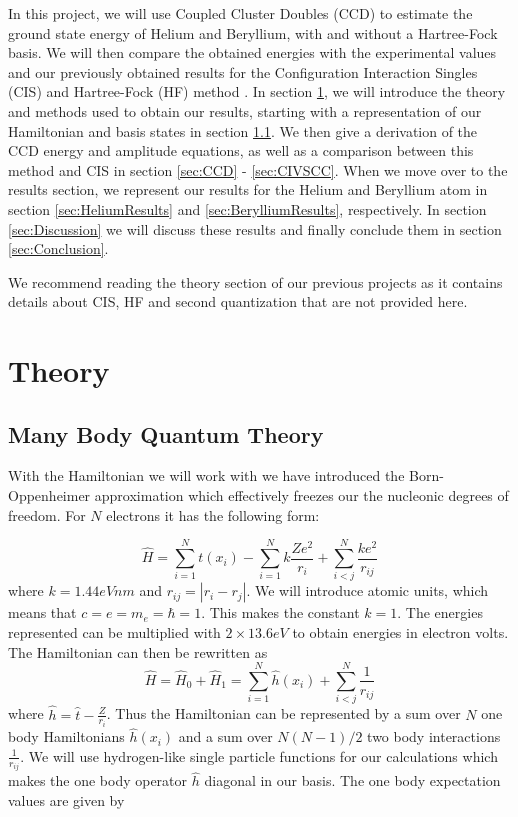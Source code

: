 \documentclass[a4paper,12pt]{article}
\begin{document}
\bigskip
In this project, we will use Coupled Cluster Doubles (CCD) to estimate the ground state energy of Helium and Beryllium, with and without a Hartree-Fock basis. We will then compare the obtained energies with the experimental values and our previously obtained results for the Configuration Interaction Singles (CIS) and Hartree-Fock (HF) method \cite{project1even}. In section \ref{sec:Theory}, we will introduce the theory and methods used to obtain our results, starting with a representation of our Hamiltonian and basis states in section \ref{subsec:manybodyqt}. We then give a derivation of the CCD energy and amplitude equations, as well as a comparison between this method and CIS in section \ref{sec:CCD} - \ref{sec:CIVSCC}. When we move over to the results section, we represent our results for the Helium and Beryllium atom in section \ref{sec:HeliumResults} and \ref{sec:BerylliumResults}, respectively. In section \ref{sec:Discussion} we will discuss these results and finally conclude them in section \ref{sec:Conclusion}.

We recommend reading the theory section of our previous projects \cite{project1even}\cite{project1stian} as it contains details about CIS, HF and second quantization that are not provided here. 

\section{Theory}
\label{sec:Theory}
\subsection{Many Body Quantum Theory}
\label{subsec:manybodyqt}
With the Hamiltonian we will work with we have introduced the Born-Oppenheimer approximation which effectively freezes our the nucleonic degrees of freedom. For $N$ electrons it has the following form:

$$\hat{H} = \sum_{i=1}^N t(x_i) - \sum_{i=1}^N k\frac{Ze^2}{r_i} + \sum_{i<j}^N \frac{ke^2}{r_{ij}}$$
where $k = 1.44 eVnm$ and $r_{ij} = |r_i - r_j|$. We will introduce atomic units, which means that $c = e = m_e = \hbar = 1$. This makes the constant $k=1$. The energies represented can be multiplied with $2 \times 13.6 eV$ to obtain energies in electron volts. The Hamiltonian can then be rewritten as
\begin{equation}
\label{eq:Hamiltonian}
	\hat{H} = \hat{H}_0 + \hat{H}_1 = \sum_{i = 1}^N \hat{h}(x_i) + \sum_{i<j}^{N} \frac{1}{r_{ij}}
\end{equation}
where $\hat{h} = \hat{t} - \frac{Z}{r_i}$. Thus the Hamiltonian can be represented by a sum over $N$ one body Hamiltonians $\hat{h}(x_i)$ and a sum over $N(N-1)/2$ two body interactions $\frac{1}{r_{ij}}$. 
We will use hydrogen-like single particle functions for our calculations which makes the one body operator $\hat{h}$ diagonal in our basis. The one body expectation values are given by
\end{document}
